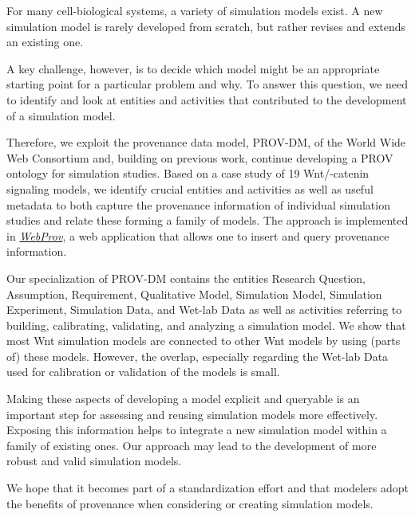 \documentclass[10pt,letterpaper]{article}
\newcommand{\webprov}{\textit{WebProv}}
\newcommand{\bcat}{\textbeta-catenin}
\newcommand{\wnt}{Wnt}
\newcommand{\RQ}{Research Question}
\newcommand{\A}{Assumption}
\newcommand{\R}{Requirement}
\newcommand{\QM}{Qualitative Model}
\newcommand{\SM}{Simulation Model}
\newcommand{\SE}{Simulation Experiment}
\newcommand{\SD}{Simulation Data}
\newcommand{\WD}{Wet-lab Data}
\begin{document}
For many cell-biological systems, a variety of simulation models exist.
A new simulation model is rarely developed from scratch, but rather revises and extends an existing one.

A key challenge, however, is to decide which model might be an appropriate starting point for a particular problem and why.
To answer this question, we need to identify and look at entities and activities that contributed to the development of a simulation model.

Therefore, we exploit the provenance data model, PROV-DM, of the World Wide Web Consortium and, building on previous work, continue developing a PROV ontology for simulation studies.
Based on a case study of 19 \wnt{}/\bcat{} signaling models, we identify crucial entities and activities as well as useful metadata to both capture the provenance information of individual simulation studies and relate these forming a family of models.
The approach is implemented in \href{https://github.com/SFB-ELAINE/WebProv}{\webprov{}}, a web application that allows one to insert and query provenance information.

Our specialization of PROV-DM contains the entities \RQ{}, \A{}, \R{}, \QM{}, \SM{}, \SE{}, \SD{}, and \WD{} as well as activities referring to building, calibrating, validating, and analyzing a simulation model.
We show that most \wnt{} simulation models are connected to other \wnt{} models by using (parts of) these models.
However, the overlap, especially regarding the \WD{} used for calibration or validation of the models is small.

Making these aspects of developing a model explicit and queryable is an important step for assessing and reusing simulation models more effectively.
Exposing this information helps to integrate a new simulation model within a family of existing ones.
Our approach may lead to the development of more robust and valid simulation models.

We hope that it becomes part of a standardization effort and that modelers adopt the benefits of provenance when considering or creating simulation models.

\end{document}
